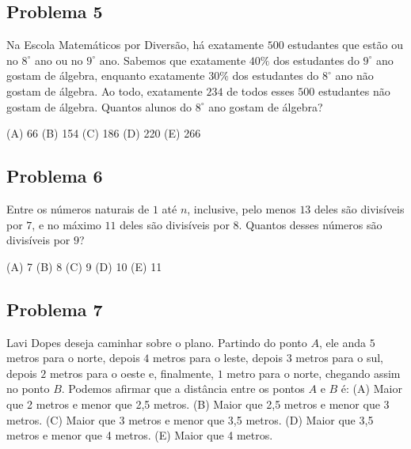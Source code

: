 \documentclass[12pt]{article}
\begin{document}
\subsection{Problema 5}
\begin{tcolorbox}[statementbox]
Na Escola Matemáticos por Diversão, há exatamente $500$ estudantes que estão ou no $8^\circ$ ano ou no $9^\circ$ ano. Sabemos que exatamente $40\%$ dos estudantes do $9^\circ$ ano gostam de álgebra, enquanto exatamente $30\%$ dos estudantes do $8^\circ$ ano não gostam de álgebra. Ao todo, exatamente $234$ de todos esses $500$ estudantes não gostam de álgebra. Quantos alunos do $8^\circ$ ano gostam de álgebra?

(A) 66 (B) 154 (C) 186 (D) 220 (E) 266
\end{tcolorbox}
\clearpage

\subsection{Problema 6}
\begin{tcolorbox}[statementbox]
Entre os números naturais de $1$ até $n$, inclusive, pelo menos $13$ deles são divisíveis por $7$, e no máximo $11$ deles são divisíveis por $8$. Quantos desses números são divisíveis por $9$?

(A) 7 (B) 8 (C) 9 (D) 10 (E) 11
\end{tcolorbox}
\clearpage

\subsection{Problema 7}
\begin{tcolorbox}[statementbox]
Lavi Dopes deseja caminhar sobre o plano. Partindo do ponto $A$, ele anda $5$ metros para o norte, depois $4$ metros para o leste, depois $3$ metros para o sul, depois $2$ metros para o oeste e, finalmente, $1$ metro para o norte, chegando assim no ponto $B$. Podemos afirmar que a distância entre os pontos $A$ e $B$ é:
(A) Maior que 2 metros e menor que 2,5 metros.
(B) Maior que 2,5 metros e menor que 3 metros.
(C) Maior que 3 metros e menor que 3,5 metros.
(D) Maior que 3,5 metros e menor que 4 metros.
(E) Maior que 4 metros.
\end{tcolorbox}
\clearpage
\end{document}
